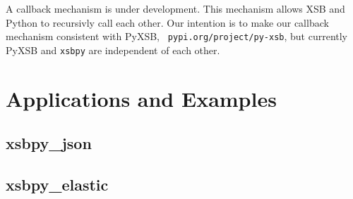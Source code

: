 A callback mechanism is under development.  This mechanism allows XSB
and Python to recursivly call each other.  Our intention is to make
our callback mechanism consistent with PyXSB, {\tt
  pypi.org/project/py-xsb}, but currently PyXSB and {\tt xsbpy} are
independent of each other.

\section{Applications and Examples}




\subsection{xsbpy\_json}

\subsection{xsbpy\_elastic}
